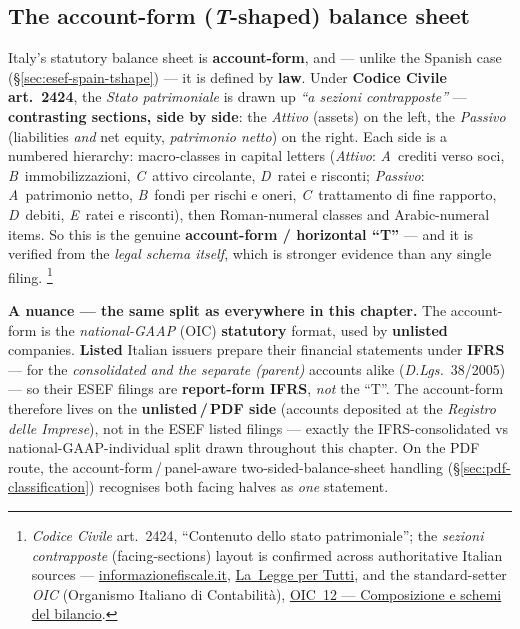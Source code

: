 \documentclass[11pt,a4paper]{report}
\begin{document}
\subsection{The account-form (\emph{T}-shaped) balance sheet}
\label{sec:esef-italy-tshape}

Italy's statutory balance sheet is \textbf{account-form}, and --- unlike the Spanish case
(\S\ref{sec:esef-spain-tshape}) --- it is defined by \textbf{law}. Under \textbf{Codice Civile art.~2424},
the \emph{Stato patrimoniale} is drawn up \emph{``a sezioni contrapposte''} --- \textbf{contrasting sections,
side by side}: the \emph{Attivo} (assets) on the left, the \emph{Passivo} (liabilities \emph{and} net equity,
\emph{patrimonio netto}) on the right. Each side is a numbered hierarchy: macro-classes in capital letters
(\emph{Attivo}: \emph{A}~crediti verso soci, \emph{B}~immobilizzazioni, \emph{C}~attivo circolante,
\emph{D}~ratei e risconti; \emph{Passivo}: \emph{A}~patrimonio netto, \emph{B}~fondi per rischi e oneri,
\emph{C}~trattamento di fine rapporto, \emph{D}~debiti, \emph{E}~ratei e risconti), then Roman-numeral
classes and Arabic-numeral items. So this is the genuine \textbf{account-form / horizontal ``T''} --- and
it is verified from the \emph{legal schema itself}, which is stronger evidence than any single filing.%
\footnote{\emph{Codice Civile} art.~2424, ``Contenuto dello stato patrimoniale''; the \emph{sezioni
contrapposte} (facing-sections) layout is confirmed across authoritative Italian sources ---
\href{https://www.informazionefiscale.it/stato-patrimoniale-schema-art-2424-bilancio}{informazionefiscale.it},
\href{https://www.laleggepertutti.it/codice-civile/art-2424-codice-civile-contenuto-dello-stato-patrimoniale}{La~Legge per Tutti},
and the standard-setter \emph{OIC} (Organismo Italiano di Contabilità),
\href{https://www.fondazioneoic.eu/wp-content/uploads/2022/10/2019-01-OIC-12-Composizione-e-schemi-del-bilancio.pdf}{OIC~12 --- Composizione e schemi del bilancio}.}

\noindent \textbf{A nuance --- the same split as everywhere in this chapter.} The account-form is the
\emph{national-GAAP} (OIC) \textbf{statutory} format, used by \textbf{unlisted} companies. \textbf{Listed}
Italian issuers prepare their financial statements under \textbf{IFRS} --- for the \emph{consolidated and the
separate (parent)} accounts alike (\emph{D.Lgs.}~38/2005) --- so their ESEF filings are \textbf{report-form
IFRS}, \emph{not} the ``T''. The account-form therefore lives on the \textbf{unlisted\,/\,PDF side} (accounts
deposited at the \emph{Registro delle Imprese}), not in the ESEF listed filings --- exactly the
IFRS-consolidated vs national-GAAP-individual split drawn throughout this chapter. On the PDF route, the
account-form\,/\,panel-aware two-sided-balance-sheet handling (\S\ref{sec:pdf-classification}) recognises
both facing halves as \emph{one} statement.
\end{document}
